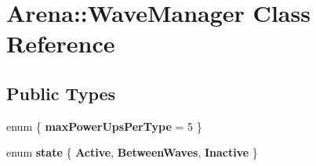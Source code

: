 \hypertarget{class_arena_1_1_wave_manager}{\section{Arena\+:\+:Wave\+Manager Class Reference}
\label{class_arena_1_1_wave_manager}
}
\subsection*{Public Types}
\begin{DoxyCompactItemize}
\item 
\hypertarget{class_arena_1_1_wave_manager_ad16e962262d0e32425e255947a0a12e8}{enum \{ {\bfseries max\+Power\+Ups\+Per\+Type} = 5
 \}}\label{class_arena_1_1_wave_manager_ad16e962262d0e32425e255947a0a12e8}

\item 
\hypertarget{class_arena_1_1_wave_manager_a7e3463cc0884056a5a852eaadc9bb3b3}{enum {\bfseries state} \{ {\bfseries Active}, 
{\bfseries Between\+Waves}, 
{\bfseries Inactive}
 \}}\label{class_arena_1_1_wave_manager_a7e3463cc0884056a5a852eaadc9bb3b3}

\end{DoxyCompactItemize}
